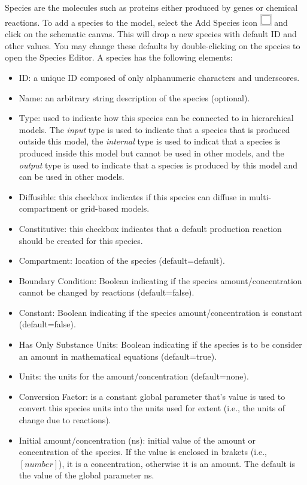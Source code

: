\documentclass[titlepage,11pt]{article}
\begin{document}
\noindent
Species are the molecules such as proteins either produced by genes or chemical reactions.  To add a species to the model, select the Add Species icon \includegraphics{../gui/icons/modelview/add_species_selected} and click on the schematic canvas.  This will drop a new species with default ID and other values.  You may change these defaults by double-clicking on the species to open the Species Editor.  A species has the following elements:
\begin{itemize} 
\item ID: a unique ID composed of only alphanumeric characters and underscores.
\item Name: an arbitrary string description of the species (optional).
\item Type: used to indicate how this species can be connected to in hierarchical models.  The \emph{input} type is used to indicate that a species that is produced outside this model, the \emph{internal} type is used to indicat that a species is produced inside this model but cannot be used in other models, and the \emph{output} type is used to indicate that a species is produced by this model and can be used in other models. 
\item Diffusible: this checkbox indicates if this species can diffuse in multi-compartment or grid-based models.
\item Constitutive: this checkbox indicates that a default production reaction should be created for this species.
\item Compartment: location of the species (default=default).
\item Boundary Condition: Boolean indicating if the species amount/concentration cannot be changed by reactions (default=false).
\item Constant: Boolean indicating if the species amount/concentration is constant (default=false).
\item Has Only Substance Units: Boolean indicating if the species is to be consider an amount in mathematical equations (default=true).
\item Units: the units for the amount/concentration (default=none).
\item Conversion Factor: is a constant global parameter that's value is used to convert this species units into the units used for extent (i.e., the units of change due to reactions).
\item Initial amount/concentration (ns): initial value of the amount or concentration of the species.  If the value is enclosed in brakets (i.e., $[number]$), it is a concentration, otherwise it is an amount.  The default is the value of the global parameter ns.

\end{itemize}
\end{document}
